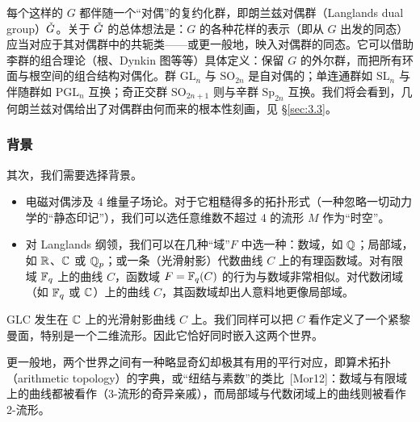 每个这样的 $G$ 都伴随一个“对偶”的复约化群，即朗兰兹对偶群（Langlands dual group）$\check{G}$。关于 $\check{G}$ 的总体想法是：$G$ 的各种花样的表示（即从 $G$ 出发的同态）应当对应于其对偶群中的共轭类——或更一般地，映入对偶群的同态。它可以借助李群的组合理论（根、Dynkin 图等等）具体定义：保留 $G$ 的外尔群，而把所有环面与根空间的组合结构对偶化。群 $\mathrm{GL}_{n}$ 与 $\mathrm{SO}_{2n}$ 是自对偶的；单连通群如 $\mathrm{SL}_{n}$ 与伴随群如 $\mathrm{PGL}_{n}$ 互换；奇正交群 $\mathrm{SO}_{2n+1}$ 则与辛群 $\mathrm{Sp}_{2n}$ 互换。我们将会看到，几何朗兰兹对偶给出了对偶群由何而来的根本性刻画，见 \S\ref{sec:3.3}。

\subsubsection{背景}\label{sec:1.4.2}

其次，我们需要选择背景。

\begin{itemize}
\item 电磁对偶涉及 4 维量子场论。对于它粗糙得多的拓扑形式（一种忽略一切动力学的“静态印记”），我们可以选任意维数不超过 4 的流形 $M$ 作为“时空”。
\item 对 Langlands 纲领，我们可以在几种“域”$F$ 中选一种：数域，如 $\mathbb{Q}$；局部域，如 $\mathbb{R}$、$\mathbb{C}$ 或 $\mathbb{Q}_{p}$；或一条（光滑射影）代数曲线 $C$ 上的有理函数域。对有限域 $\mathbb{F}_{q}$ 上的曲线 $C$，函数域 $F=\mathbb{F}_{q}(C)$ 的行为与数域非常相似。对代数闭域（如 $\mathbb{F}_{q}$ 或 $\mathbb{C}$）上的曲线 $C$，其函数域却出人意料地更像局部域。
\end{itemize}

GLC 发生在 $\mathbb{C}$ 上的光滑射影曲线 $C$ 上。我们同样可以把 $C$ 看作定义了一个紧黎曼面，特别是一个二维流形。因此它恰好同时嵌入这两个世界。

更一般地，两个世界之间有一种略显奇幻却极其有用的平行对应，即算术拓扑（arithmetic topology）的字典，或“纽结与素数”的类比~[Mor12]：数域与有限域上的曲线都被看作（3-流形的奇异亲戚），而局部域与代数闭域上的曲线则被看作 2-流形。

